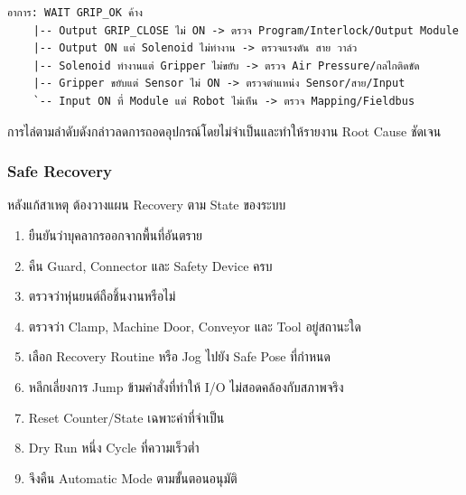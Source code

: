 \begin{verbatim}
อาการ: WAIT GRIP_OK ค้าง
    |-- Output GRIP_CLOSE ไม่ ON -> ตรวจ Program/Interlock/Output Module
    |-- Output ON แต่ Solenoid ไม่ทำงาน -> ตรวจแรงดัน สาย วาล์ว
    |-- Solenoid ทำงานแต่ Gripper ไม่ขยับ -> ตรวจ Air Pressure/กลไกติดขัด
    |-- Gripper ขยับแต่ Sensor ไม่ ON -> ตรวจตำแหน่ง Sensor/สาย/Input
    `-- Input ON ที่ Module แต่ Robot ไม่เห็น -> ตรวจ Mapping/Fieldbus
\end{verbatim}

การไล่ตามลำดับดังกล่าวลดการถอดอุปกรณ์โดยไม่จำเป็นและทำให้รายงาน Root Cause ชัดเจน

\subsubsection{Safe Recovery}

หลังแก้สาเหตุ ต้องวางแผน Recovery ตาม State ของระบบ

\begin{enumerate}
    \item ยืนยันว่าบุคลากรออกจากพื้นที่อันตราย
    \item คืน Guard, Connector และ Safety Device ครบ
    \item ตรวจว่าหุ่นยนต์ถือชิ้นงานหรือไม่
    \item ตรวจว่า Clamp, Machine Door, Conveyor และ Tool อยู่สถานะใด
    \item เลือก Recovery Routine หรือ Jog ไปยัง Safe Pose ที่กำหนด
    \item หลีกเลี่ยงการ Jump ข้ามคำสั่งที่ทำให้ I/O ไม่สอดคล้องกับสภาพจริง
    \item Reset Counter/State เฉพาะค่าที่จำเป็น
    \item Dry Run หนึ่ง Cycle ที่ความเร็วต่ำ
    \item จึงคืน Automatic Mode ตามขั้นตอนอนุมัติ
\end{enumerate}


